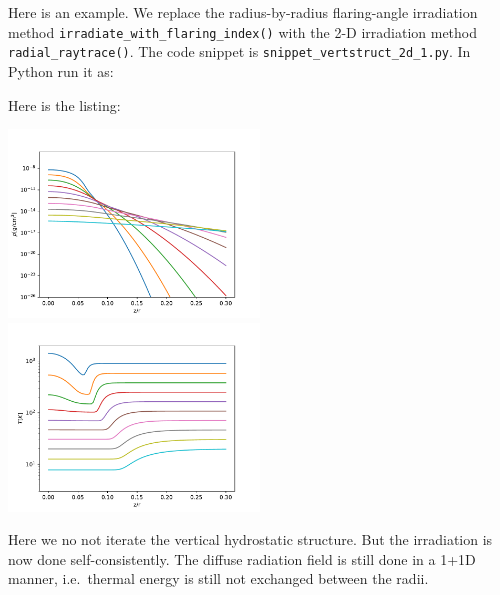 \documentclass{book}
\newcommand{\code}[1]{{\small\tt #1}}
\begin{document}
Here is an example. We replace the radius-by-radius flaring-angle irradiation method
\code{irradiate\_with\_flaring\_index()} with the 2-D irradiation
method \code{radial\_raytrace()}. The code snippet is
\code{snippet\_vertstruct\_2d\_1.py}. In Python run it as:
\begin{codebox}
\end{codebox}
Here is the listing:

\centerline{\includegraphics[width=0.5\textwidth]{../snippets/fig_snippet_vertstruct_2d_1_1.pdf}
\includegraphics[width=0.5\textwidth]{../snippets/fig_snippet_vertstruct_2d_1_2.pdf}}
%
Here we no not iterate the vertical hydrostatic structure. But the irradiation
is now done self-consistently. The diffuse radiation field is still done in a
1+1D manner, i.e.~thermal energy is still not exchanged between the radii.
\end{document}
